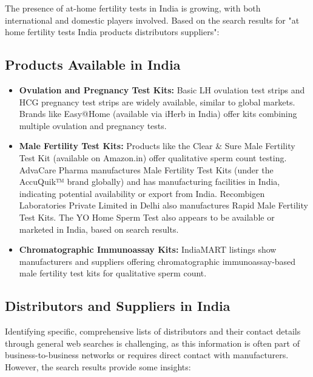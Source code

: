 \documentclass{article}
\begin{document}
The presence of at-home fertility tests in India is growing, with both international and domestic players involved. Based on the search results for "at home fertility tests India products distributors suppliers":

\subsection{Products Available in India}
\begin{itemize}
    \item \textbf{Ovulation and Pregnancy Test Kits:} Basic LH ovulation test strips and HCG pregnancy test strips are widely available, similar to global markets. Brands like Easy@Home (available via iHerb in India) offer kits combining multiple ovulation and pregnancy tests.
    \item \textbf{Male Fertility Test Kits:} Products like the Clear & Sure Male Fertility Test Kit (available on Amazon.in) offer qualitative sperm count testing. AdvaCare Pharma manufactures Male Fertility Test Kits (under the AccuQuik™ brand globally) and has manufacturing facilities in India, indicating potential availability or export from India. Recombigen Laboratories Private Limited in Delhi also manufactures Rapid Male Fertility Test Kits. The YO Home Sperm Test also appears to be available or marketed in India, based on search results.
    \item \textbf{Chromatographic Immunoassay Kits:} IndiaMART listings show manufacturers and suppliers offering chromatographic immunoassay-based male fertility test kits for qualitative sperm count.
\end{itemize}

\subsection{Distributors and Suppliers in India}
Identifying specific, comprehensive lists of distributors and their contact details through general web searches is challenging, as this information is often part of business-to-business networks or requires direct contact with manufacturers. However, the search results provide some insights:
\end{document}
